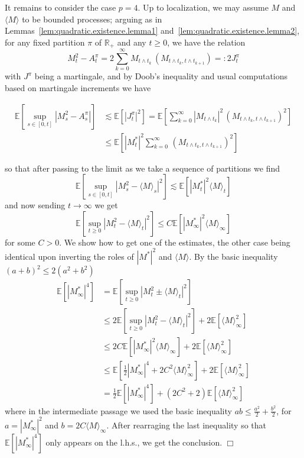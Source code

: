 \documentclass{article}
\newcommand{\eqqcolon}{=:}
\newcommand{\textbf}[1]{\text{{\bfseries{#1}}}}
\newenvironment{proof}{\noindent\textbf{Proof\ }}{\hspace*{\fill}$\Box$\medskip}
\newcommand{\1}{\1}
\begin{document}
{\begin{proof}
  It remains to consider the case $p = 4$. Up to localization, we may assume
  $M$ and $\langle M \rangle$ to be bounded processes; arguing as in
  Lemmas~\ref{lem:quadratic.existence.lemma1}
  and~\ref{lem:quadratic.existence.lemma2}, for any fixed partition $\pi$ of
  $\mathbb{R}_+$ and any $t \geqslant 0$, we have the relation
  \[ M^2_t - A^{\pi}_t = 2 \sum_{k = 0}^{\infty} M_{t \wedge t_k} \, (M_{t
     \wedge t_k, t \wedge t_{k + 1}}) \eqqcolon 2 J^{\pi}_t \]
  with $J^{\pi}$ being a martingale, and by Doob's inequality and usual
  computations based on martingale increments we have
  
  \begin{align*}
    \mathbb{E} [\sup_{s \in [0, t]} | M^2_s - A^{\pi}_s |] & \lesssim
    \mathbb{E} [| J^{\pi}_t |^2] =\mathbb{E} \left[ \sum_{k = 0}^{\infty} |
    M_{t \wedge t_k} |^2 \, (M_{t \wedge t_k, t \wedge t_{k + 1}})^2 \right]\\
    & \leqslant \mathbb{E} \left[ | M^{*}_t |^2  \sum_{k = 0}^{\infty} \,
    (M_{t \wedge t_k, t \wedge t_{k + 1}})^2 \right]
  \end{align*}
  
  so that after passing to the limit as we take a sequence of partitions we
  find
  \[ \mathbb{E} [\sup_{s \in [0, t]} | M^2_s - \langle M \rangle_s |^2]
     \lesssim \mathbb{E} [| M^{*}_t |^2 \langle M \rangle_t] \]
  and now sending $t \rightarrow \infty$ we get
  \[ \mathbb{E} [\sup_{t \geqslant 0} | M^2_t - \langle M \rangle_t |^2]
     \leqslant C\mathbb{E} [| M^{*}_{\infty} |^2 \langle M
     \rangle_{\infty}] \]
  for some $C > 0$. We show how to get one of the estimates, the other case
  being identical upon inverting the roles of $| M^{*} |^2$ and $\langle M
  \rangle$. By the basic inequality $(a + b)^2 \leqslant 2 (a^2 + b^2)$
  \[ \begin{align*}
       \mathbb{E} [| M_{\infty}^{*} |^4] & =\mathbb{E} [\sup_{t \geqslant
       0} | M_t^2 \pm \langle M \rangle_t |^2]\\
       & \leqslant 2\mathbb{E} [\sup_{t \geqslant 0} | M^2_t - \langle M
       \rangle_t |^2] + 2\mathbb{E} [\langle M \rangle_{\infty}^2]\\
       & \leqslant 2 C\mathbb{E} [| M^{*}_{\infty} |^2 \langle M
       \rangle_{\infty}] + 2\mathbb{E} [\langle M \rangle_{\infty}^2]\\
       & \leqslant \mathbb{E} \left[ \frac{1}{2} | M^{*}_{\infty} |^4 + 2
       C^2 \langle M \rangle_{\infty}^2 \right] + 2\mathbb{E} [\langle M
       \rangle_{\infty}^2]\\
       & = \frac{1}{2} \mathbb{E} [| M^{*}_{\infty} |^4] + (2 C^2 + 2)
       \mathbb{E} [\langle M \rangle_{\infty}^2]
     \end{align*} \]
  where in the intermediate passage we used the basic inequality $a b
  \leqslant \frac{a^2}{2} + \frac{b^2}{2}$, for $a = | M^{*}_{\infty} |^2$
  and $b = 2 C \langle M \rangle_{\infty}$. After rearraging the last
  inequality so that $\mathbb{E} [| M^{*}_{\infty} |^4]$ only appears on
  the l.h.s., we get the conclusion.
\end{proof}

}
\end{document}
